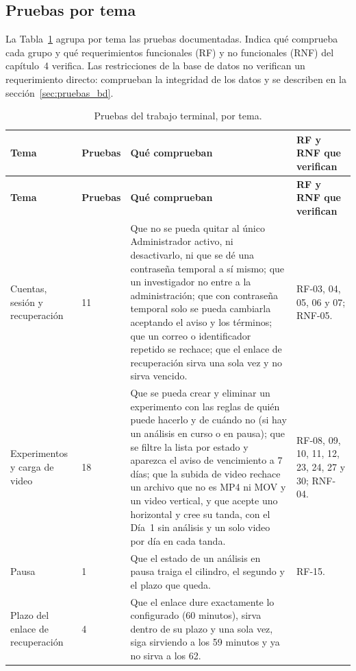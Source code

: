 \subsection{Pruebas por tema}

La Tabla~\ref{tab:pruebas_seleccion} agrupa por tema las pruebas documentadas. Indica qué comprueba
cada grupo y qué requerimientos funcionales (RF) y no funcionales (RNF) del
capítulo~4 verifica. Las restricciones de la base de datos no verifican un requerimiento
directo: comprueban la integridad de los datos y se describen en la
sección~\ref{sec:pruebas_bd}.

{\footnotesize\singlespacing
\begin{longtable}{|>{\raggedright}p{2.7cm}|>{\raggedright}p{1.4cm}|>{\raggedright}p{6.0cm}|>{\raggedright\arraybackslash}p{3.0cm}|}
\caption{Pruebas del trabajo terminal, por tema.
\label{tab:pruebas_seleccion}}\\
\hline
\textbf{Tema} & \textbf{Pruebas} & \textbf{Qué comprueban} & \textbf{RF y RNF que verifican} \\
\hline
\endfirsthead
\hline
\textbf{Tema} & \textbf{Pruebas} & \textbf{Qué comprueban} & \textbf{RF y RNF que verifican} \\
\hline
\endhead
Cuentas, sesión y recuperación
& 11
& Que no se pueda quitar al único Administrador activo, ni desactivarlo, ni que se dé una contraseña temporal a sí mismo; que un investigador no entre a la administración; que con contraseña temporal solo se pueda cambiarla aceptando el aviso y los términos; que un correo o identificador repetido se rechace; que el enlace de recuperación sirva una sola vez y no sirva vencido.
& RF-03, 04, 05, 06 y 07; RNF-05. \\
\hline
Experimentos y carga de video
& 18
& Que se pueda crear y eliminar un experimento con las reglas de quién puede hacerlo y de cuándo no (si hay un análisis en curso o en pausa); que se filtre la lista por estado y aparezca el aviso de vencimiento a 7 días; que la subida de video rechace un archivo que no es MP4 ni MOV y un video vertical, y que acepte uno horizontal y cree su tanda, con el Día~1 sin análisis y un solo video por día en cada tanda.
& RF-08, 09, 10, 11, 12, 23, 24, 27 y 30; RNF-04. \\
\hline
Pausa
& 1
& Que el estado de un análisis en pausa traiga el cilindro, el segundo y el plazo que queda.
& RF-15. \\
\hline
Plazo del enlace de recuperación
& 4
& Que el enlace dure exactamente lo configurado (60 minutos), sirva dentro de su plazo y una sola vez, siga sirviendo a los 59 minutos y ya no sirva a los 62.

\end{longtable}}
